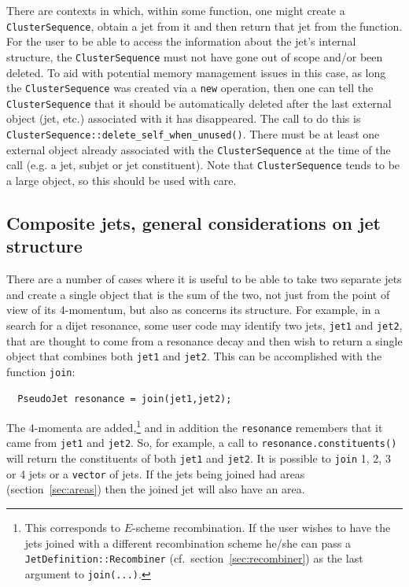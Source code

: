 \documentclass[12pt,a4]{article}
\newcommand{\ttt}[1]{{\small\texttt{#1}}}
\newcommand{\ClusterSequence}{\ttt{ClusterSequence}\xspace}
\begin{document}
There are contexts in which, within some function, one might create a
\ClusterSequence, obtain a jet from it and then return that jet from
the function. For the user to be able to access the information about
the jet's internal structure, the \ClusterSequence must not have gone
out of scope and/or been deleted.
%
To aid with potential memory management issues in this case, as long
the \ClusterSequence was created via a \ttt{new} operation,
then one can tell the \ClusterSequence that it should be automatically
deleted after the last external object (jet, etc.)  associated with it
has disappeared. 
%
The call to do this is
\ttt{ClusterSequence::delete\_self\_when\_unused()}. There must be at
least one external object already associated with the \ClusterSequence
at the time of the call (e.g. a jet, subjet or jet constituent).
%
Note that \ClusterSequence tends to be a large object, so this should be
used with care.

\subsection{Composite jets, general considerations on jet structure}
\label{sec:composite-jet}

There are a number of cases where it is useful to be able to take two
separate jets and create a single object that is the sum of the two,
not just from the point of view of its 4-momentum, but also as
concerns its structure.
%
For example, in a search for a dijet resonance, some user code may
identify two jets, \ttt{jet1} and \ttt{jet2}, that are thought to come
from a resonance decay and then wish to return a single object that
combines both \ttt{jet1} and \ttt{jet2}.
%
This can be accomplished with the function \ttt{join}:
%
\begin{lstlisting}
  PseudoJet resonance = join(jet1,jet2); 
\end{lstlisting}
The 4-momenta are added,\footnote{This corresponds to $E$-scheme
  recombination. If the user wishes to have the jets joined with a
  different recombination scheme he/she can pass a
  \texttt{JetDefinition::Recombiner} (cf.\ section~\ref{sec:recombiner})
  as the last argument to \texttt{join(...)}.} and in addition the
\ttt{resonance} remembers that it came from \ttt{jet1} and
\ttt{jet2}. So, for example, a call to \ttt{resonance.constituents()}
will return the constituents of both \ttt{jet1} and \ttt{jet2}.
%
It is possible to \ttt{join} 1, 2, 3 or 4 jets or a \ttt{vector} of
jets.
%
If the jets being joined had areas (section~\ref{sec:areas}) then the
joined jet will also have an area.
\end{document}
